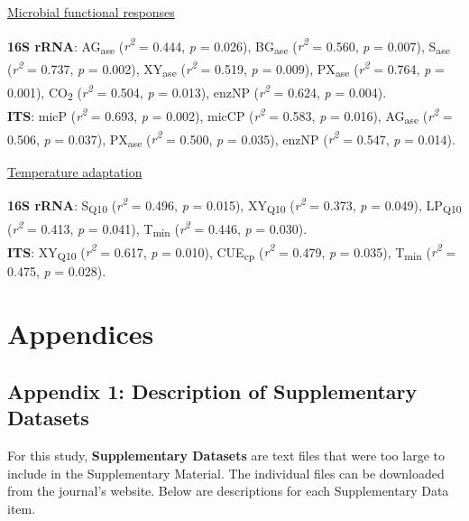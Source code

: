 \documentclass[
  10pt,
  letterpaper,
  DIV=11,
  numbers=noendperiod]{scrartcl}
\begin{document}
\underline{Microbial functional responses}

\textbf{16S rRNA}: AG\textsubscript{ase} (\emph{r\textsuperscript{2}} =
0.444, \emph{p} = 0.026), BG\textsubscript{ase}
(\emph{r\textsuperscript{2}} = 0.560, \emph{p} = 0.007),
S\textsubscript{ase} (\emph{r\textsuperscript{2}} = 0.737, \emph{p} =
0.002), XY\textsubscript{ase} (\emph{r\textsuperscript{2}} = 0.519,
\emph{p} = 0.009), PX\textsubscript{ase} (\emph{r\textsuperscript{2}} =
0.764, \emph{p} = 0.001), CO\textsubscript{2}
(\emph{r\textsuperscript{2}} = 0.504, \emph{p} = 0.013), enzNP
(\emph{r\textsuperscript{2}} = 0.624, \emph{p} = 0.004).\\
\textbf{ITS}: micP (\emph{r\textsuperscript{2}} = 0.693, \emph{p} =
0.002), micCP (\emph{r\textsuperscript{2}} = 0.583, \emph{p} = 0.016),
AG\textsubscript{ase} (\emph{r\textsuperscript{2}} = 0.506, \emph{p} =
0.037), PX\textsubscript{ase} (\emph{r\textsuperscript{2}} = 0.500,
\emph{p} = 0.035), enzNP (\emph{r\textsuperscript{2}} = 0.547, \emph{p}
= 0.014).

\underline{Temperature adaptation}

\textbf{16S rRNA}: S\textsubscript{Q10} (\emph{r\textsuperscript{2}} =
0.496, \emph{p} = 0.015), XY\textsubscript{Q10}
(\emph{r\textsuperscript{2}} = 0.373, \emph{p} = 0.049),
LP\textsubscript{Q10} (\emph{r\textsuperscript{2}} = 0.413, \emph{p} =
0.041), T\textsubscript{min} (\emph{r\textsuperscript{2}} = 0.446,
\emph{p} = 0.030).\\
\textbf{ITS}: XY\textsubscript{Q10} (\emph{r\textsuperscript{2}} =
0.617, \emph{p} = 0.010), CUE\textsubscript{cp}
(\emph{r\textsuperscript{2}} = 0.479, \emph{p} = 0.035),
T\textsubscript{min} (\emph{r\textsuperscript{2}} = 0.475, \emph{p} =
0.028).

\newpage{}

\hypertarget{appendices}{%
\section{Appendices}\label{appendices}}

\hypertarget{appendix-1}{%
\subsection{Appendix 1: Description of Supplementary
Datasets}\label{appendix-1}}

For this study, \textbf{Supplementary Datasets} are text files that were
too large to include in the Supplementary Material. The individual files
can be downloaded from the journal's website. Below are descriptions for
each Supplementary Data item.
\end{document}
